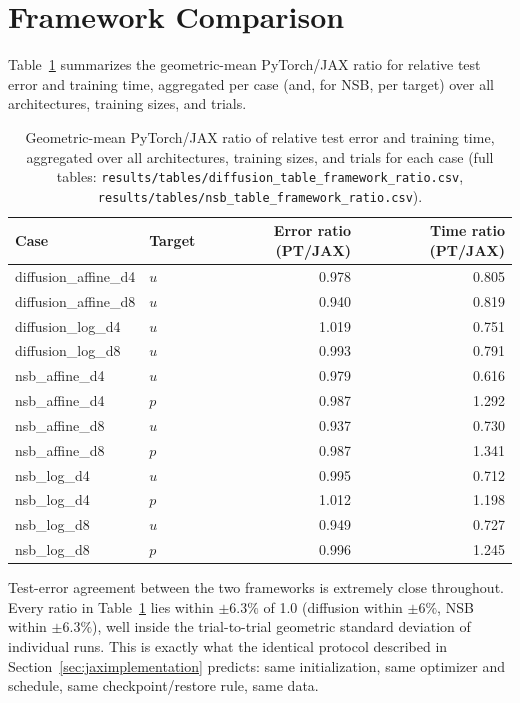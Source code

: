 \section{Framework Comparison}
\label{sec:framework-comparison-results}

Table~\ref{tab:framework-ratio} summarizes the geometric-mean PyTorch/JAX
ratio for relative test error and training time, aggregated per case (and,
for NSB, per target) over all architectures, training sizes, and trials.

\begin{table}[htbp]
    \centering
    \begin{tabular}{llrr}
        \toprule
        Case & Target & Error ratio (PT/JAX) & Time ratio (PT/JAX) \\
        \midrule
        diffusion\_affine\_d4 & $u$ & 0.978 & 0.805 \\
        diffusion\_affine\_d8 & $u$ & 0.940 & 0.819 \\
        diffusion\_log\_d4 & $u$ & 1.019 & 0.751 \\
        diffusion\_log\_d8 & $u$ & 0.993 & 0.791 \\
        nsb\_affine\_d4 & $u$ & 0.979 & 0.616 \\
        nsb\_affine\_d4 & $p$ & 0.987 & 1.292 \\
        nsb\_affine\_d8 & $u$ & 0.937 & 0.730 \\
        nsb\_affine\_d8 & $p$ & 0.987 & 1.341 \\
        nsb\_log\_d4 & $u$ & 0.995 & 0.712 \\
        nsb\_log\_d4 & $p$ & 1.012 & 1.198 \\
        nsb\_log\_d8 & $u$ & 0.949 & 0.727 \\
        nsb\_log\_d8 & $p$ & 0.996 & 1.245 \\
        \bottomrule
    \end{tabular}
    \caption{Geometric-mean PyTorch/JAX ratio of relative test error and
    training time, aggregated over all architectures, training sizes, and
    trials for each case (full tables:
    \texttt{results/tables/diffusion\_table\_framework\_ratio.csv},
    \texttt{results/tables/nsb\_table\_framework\_ratio.csv}).}
    \label{tab:framework-ratio}
\end{table}

Test-error agreement between the two frameworks is extremely close
throughout. Every ratio in Table~\ref{tab:framework-ratio} lies within
$\pm 6.3\%$ of 1.0 (diffusion within $\pm 6\%$, NSB within $\pm 6.3\%$),
well inside the trial-to-trial geometric standard deviation of individual
runs. This is exactly what the identical protocol described in
Section~\ref{sec:jaximplementation} predicts: same initialization, same
optimizer and schedule, same checkpoint/restore rule, same data.

